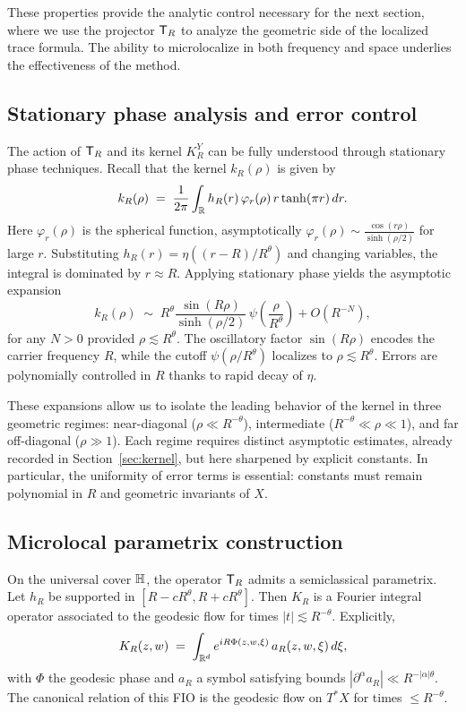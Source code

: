 These properties provide the analytic control necessary for the next section, where we use the projector $\mathsf{T}_R$ to analyze the geometric side of the localized trace formula. The ability to microlocalize in both frequency and space underlies the effectiveness of the method.


\subsection{Stationary phase analysis and error control}\label{subsec:microlocal-stationary}

The action of $\mathsf{T}_R$ and its kernel $K_R^Y$ can be fully understood through stationary phase techniques. Recall that the kernel $k_R(\rho)$ is given by
\[
k_R(\rho) \;=\; \frac{1}{2\pi} \int_{\mathbb{R}} h_R(r) \, \varphi_r(\rho) \, r \tanh(\pi r) \, dr.
\]
Here $\varphi_r(\rho)$ is the spherical function, asymptotically $\varphi_r(\rho)\sim \frac{\cos(r\rho)}{\sinh(\rho/2)}$ for large $r$. Substituting $h_R(r)=\eta((r-R)/R^\theta)$ and changing variables, the integral is dominated by $r\approx R$. Applying stationary phase yields the asymptotic expansion
\[
k_R(\rho) \;\sim\; R^\theta \frac{\sin(R\rho)}{\sinh(\rho/2)}\,\psi\!\left(\frac{\rho}{R^\theta}\right)
+ O(R^{-N}),
\]
for any $N>0$ provided $\rho\lesssim R^\theta$. The oscillatory factor $\sin(R\rho)$ encodes the carrier frequency $R$, while the cutoff $\psi(\rho/R^\theta)$ localizes to $\rho\lesssim R^\theta$. Errors are polynomially controlled in $R$ thanks to rapid decay of $\eta$.

These expansions allow us to isolate the leading behavior of the kernel in three geometric regimes: near-diagonal ($\rho\ll R^{-\theta}$), intermediate ($R^{-\theta}\ll\rho\ll 1$), and far off-diagonal ($\rho\gg 1$). Each regime requires distinct asymptotic estimates, already recorded in Section~\ref{sec:kernel}, but here sharpened by explicit constants. In particular, the uniformity of error terms is essential: constants must remain polynomial in $R$ and geometric invariants of $X$.

\subsection{Microlocal parametrix construction}\label{subsec:microlocal-parametrix}

On the universal cover $\mathbb{H}$, the operator $\mathsf{T}_R$ admits a semiclassical parametrix. Let $h_R$ be supported in $[R-cR^\theta,R+cR^\theta]$. Then $K_R$ is a Fourier integral operator associated to the geodesic flow for times $|t|\lesssim R^{-\theta}$. Explicitly,
\[
K_R(z,w) \;=\; \int_{\mathbb{R}^d} e^{iR \Phi(z,w,\xi)}\, a_R(z,w,\xi)\, d\xi,
\]
with $\Phi$ the geodesic phase and $a_R$ a symbol satisfying bounds $|\partial^\alpha a_R|\ll R^{-|\alpha|\theta}$. The canonical relation of this FIO is the geodesic flow on $T^*X$ for times $\le R^{-\theta}$.

